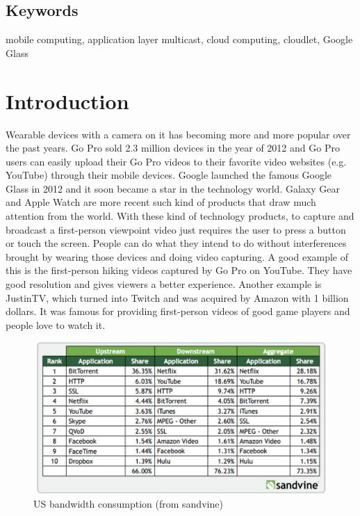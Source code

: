 \documentclass[letterpaper,twocolumn,10pt]{article}
\begin{document}
\subsection*{Keywords}

mobile computing, application layer multicast, cloud computing, cloudlet, Google Glass

\section{Introduction}

Wearable devices with a camera on it has becoming more and more popular over the past years. Go Pro sold 2.3 million devices in the year of 2012 and Go Pro users can easily upload their Go Pro videos to their favorite video websites (e.g. YouTube) through their mobile devices. Google launched the famous Google Glass in 2012 and it soon became a star in the technology world. Galaxy Gear and Apple Watch are more recent such kind of products that draw much attention from the world. With these kind of technology products, to capture and broadcast a first-person viewpoint video just requires the user to press a button or touch the screen. People can do what they intend to do without interferences brought by wearing those devices and doing video capturing. A good example of this is the first-person hiking videos captured by Go Pro on YouTube. They have good resolution and gives viewers a better experience. Another example is JustinTV, which turned into Twitch and was acquired by Amazon with 1 billion dollars. It was famous for providing first-person videos of good game players and people love to watch it.

\begin{figure}[t]
\begin{center}
\includegraphics[scale=0.3]{pic/bandwidth_rank.png}
\end{center}
\caption{US bandwidth consumption (from sandvine)}
\end{figure}
\end{document}
